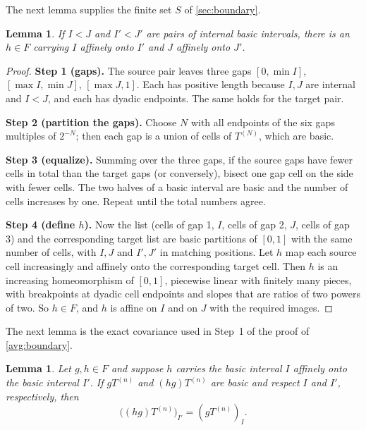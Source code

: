 \documentclass[11pt]{article}
\newtheorem{lemma}[theorem]{Lemma}
\theoremstyle{definition}
\numberwithin{equation}{section}
\newcommand{\step}[1]{\par\smallskip\noindent\textbf{Step #1.}\enspace}
\begin{document}
The next lemma supplies the finite set \(S\) of \cref{sec:boundary}.

\begin{lemma}\label{dyad:transport}
If \(I<J\) and \(I'<J'\) are pairs of internal basic intervals, there is
an \(h\in F\) carrying \(I\) affinely onto \(I'\) and \(J\) affinely onto
\(J'\).
\end{lemma}

\begin{proof}
\step{1 (gaps)}
The source pair leaves three gaps \([0,\min I]\), \([\max I,\min J]\),
\([\max J,1]\). Each has positive length because \(I,J\) are internal and
\(I<J\), and each has dyadic endpoints. The same holds for the target pair.

\step{2 (partition the gaps)}
Choose \(N\) with all endpoints of the six gaps multiples of \(2^{-N}\);
then each gap is a union of cells of \(T^{(N)}\), which are basic.

\step{3 (equalize)}
Summing over the three gaps, if the source gaps have fewer cells in total
than the target gaps (or conversely), bisect one gap cell on the side with
fewer cells. The two halves of a basic interval are basic and the number of
cells increases by one. Repeat until the total numbers agree.

\step{4 (define \(h\))}
Now the list (cells of gap 1, \(I\), cells of gap 2, \(J\), cells of gap 3)
and the corresponding target list are basic partitions of \([0,1]\) with the
same number of cells, with \(I,J\) and \(I',J'\) in matching positions.
Let \(h\) map each source cell increasingly and affinely onto the
corresponding target cell. Then \(h\) is an increasing homeomorphism of
\([0,1]\), piecewise linear with finitely many pieces, with breakpoints at
dyadic cell endpoints and slopes that are ratios of two powers of two.
So \(h\in F\), and \(h\) is affine on \(I\) and on \(J\) with the required
images.
\end{proof}

The next lemma is the exact covariance used in Step~1 of the proof of
\cref{avg:boundary}.

\begin{lemma}\label{dyad:cov}
Let \(g,h\in F\) and suppose \(h\) carries the basic interval \(I\) affinely
onto the basic interval \(I'\). If \(gT^{(n)}\) and \((hg)T^{(n)}\) are
basic and respect \(I\) and \(I'\), respectively, then
\begin{equation}\label{dyad:covariance}
  \bigl((hg)T^{(n)}\bigr)_{I'}=(gT^{(n)})_I.
\end{equation}
\end{lemma}
\end{document}
